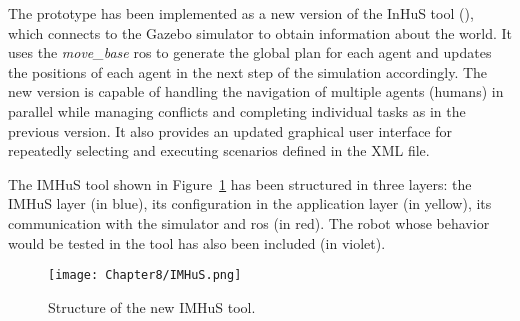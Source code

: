 The prototype has been implemented as a new version of the InHuS tool (\cite{favier_SSC}), which connects to the Gazebo simulator to obtain information about the world. It uses the \emph{move\_base} \acrshort{ros} to generate the global plan for each agent and updates the positions of each agent in the next step of the simulation accordingly. The new version is capable of handling the navigation of multiple agents (humans) in parallel while managing conflicts and completing individual tasks as in the previous version. It also provides an updated graphical user interface for repeatedly selecting and executing scenarios defined in the XML file.

The IMHuS tool shown in Figure~\ref{fig:imhus} has been structured in three layers: the IMHuS layer (in blue), its configuration in the application layer (in yellow), its communication with the simulator and \acrshort{ros} (in red). The robot whose behavior would be tested in the tool has also been included (in violet).

  \begin{figure}[ht]%
     \centering
     \texttt{[image: Chapter8/IMHuS.png]}
     \caption{Structure of the new IMHuS tool.}
     \label{fig:imhus}
 \end{figure}

